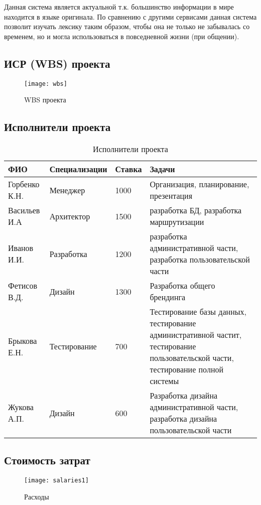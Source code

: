 \documentclass[a4paper,14pt]{extarticle}
\begin{document}
Данная система является актуальной т.к. большинство информации в мире находится
в языке оригинала. По сравнению с другими сервисами данная система позволит
изучать лексику таким образом, чтобы она не только не забывалась со временем, но
и могла использоваться в повседневной жизни (при общении).

\subsection{ИСР (WBS) проекта}
\begin{figure}[H]
    \centering
    \texttt{[image: wbs]}
    \caption{WBS проекта}
    \label{fig:wbs}
\end{figure}

\subsection{Исполнители проекта}
\begin{table}[H]
    \caption{Исполнители проекта}
    \begin{tabular}{ | p{3cm} | p{3.5cm} | p{2cm} | p{7cm} | }
        \hline
        ФИО & Специализации & Ставка & Задачи \\ \hline
        Горбенко К.Н. & Менеджер & 1000 & Организация, планирование, презентация \\ \hline
        Васильев И.А & Архитектор & 1500 & разработка БД, разработка маршрутизации \\ \hline
        Иванов И.И. & Разработка & 1200 & разработка административной части, разработка пользовательской части \\ \hline 
        Фетисов В.Д. & Дизайн & 1300 & Разработка общего брендинга \\ \hline
        Брыкова Е.Н. & Тестирование & 700 & Тестирование базы данных, тестирование административной частит, тестирование пользовательской части, тестирование полной системы \\ \hline
        Жукова А.П. & Дизайн & 600 & Разработка дизайна административной части, разработка дизайна пользовательской части \\ \hline
    \end{tabular}
\end{table}

\subsection{Стоимость затрат}
\begin{figure}[H]
    \centering
    \texttt{[image: salaries1]}
    \caption{Расходы}
    \label{fig:salaries1}
\end{figure}
\end{document}
